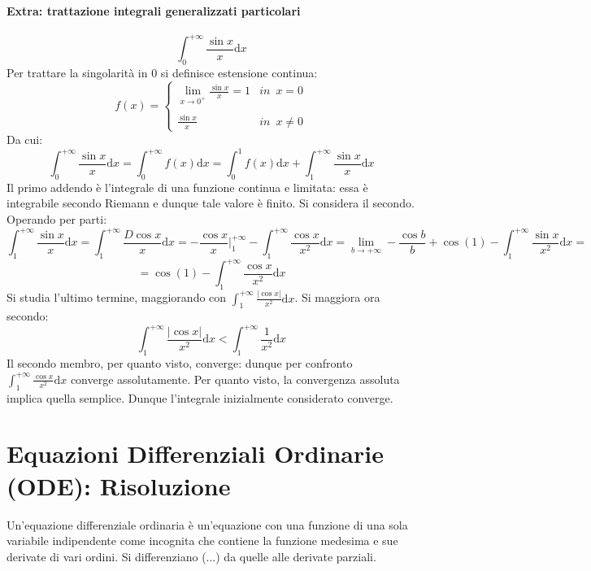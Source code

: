 \documentclass[10pt, oneside]{book}
\theoremstyle{plain}
\begin{document}
\subsubsection{Extra: trattazione integrali generalizzati particolari}
\[\int_0^{+\infty} \frac{\sin x}{x}\textrm{d}x\]
Per trattare la singolarità in $0$ si definisce estensione continua:
\[f(x) = \begin{cases}
    \lim\limits_{x \rightarrow 0^+} \frac{\sin x}{x} = 1 & in \enspace x=0\\
    \\
    \frac{\sin x}{x} & in \enspace x\neq 0
\end{cases}\]
Da cui:
\[\int_0^{+\infty} \frac{\sin x}{x}\textrm{d}x = \int_0^{+\infty} f(x) \textrm{d}x = \int_0^{1} f(x)\textrm{d}x + \int_1^{+\infty} \frac{\sin x}{x}\textrm{d}x\]
Il primo addendo è l'integrale di una funzione continua e limitata: essa è integrabile secondo Riemann e dunque tale valore è finito. Si considera il secondo.
\\Operando per parti:
\[\int_1^{+\infty} \frac{\sin x}{x}\textrm{d}x = \int_1^{+\infty} \frac{D\cos x}{x}\textrm{d}x = -\frac{\cos x}{x}\bigg|_1^{+\infty} - \int_1^{+\infty} \frac{\cos x}{x^2}\textrm{d}x = \lim\limits_{b \rightarrow +\infty} - \frac{\cos b}{b} + \cos (1) - \int_1^{+\infty} \frac{\sin x}{x^2}\textrm{d}x = \]
\[= \cos (1) - \int_1^{+\infty} \frac{\cos x}{x^2}\textrm{d}x\]
Si studia l'ultimo termine, maggiorando con $\int_1^{+\infty} \frac{|\cos x|}{x^2}\textrm{d}x$. Si maggiora ora secondo:
\[\int_1^{+\infty} \frac{|\cos x|}{x^2}\textrm{d}x < \int_1^{+\infty} \frac{1}{x^2}\textrm{d}x\]
Il secondo membro, per quanto visto, converge: dunque per confronto $\int_1^{+\infty} \frac{\cos x}{x^2}\textrm{d}x$ converge assolutamente. Per quanto visto, la convergenza assoluta implica quella semplice. Dunque l'integrale inizialmente considerato converge.


\chapter{Equazioni Differenziali Ordinarie (ODE): Risoluzione}

\begin{defin}
    Un'equazione differenziale ordinaria è un'equazione con una funzione di una sola variabile indipendente come incognita che contiene la funzione medesima e sue derivate di vari ordini. Si differenziano (...) da quelle alle derivate parziali.
\end{defin}
\end{document}
